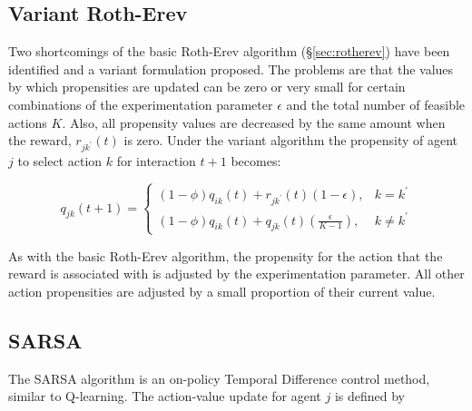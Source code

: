 \subsection{Variant Roth-Erev}
\label{sec:variant}
Two shortcomings of the basic Roth-Erev algorithm (\S\ref{sec:rotherev}) have
been identified and a variant formulation proposed\cite{nicolaisen:2001}. The
problems are that the values by which propensities are updated can be zero or
very small for certain combinations of the experimentation parameter
$\epsilon$ and the total number of feasible actions $K$.  Also, all
propensity values are decreased by the same amount when the reward,
$r_{jk^\prime}(t)$ is zero.  Under the variant algorithm the propensity of
agent $j$ to select action $k$ for interaction $t+1$ becomes:

\begin{equation}
q_{jk}(t+1) =
\begin{cases}
(1-\phi)q_{ik}(t) + r_{jk^\prime}(t)(1-\epsilon), & \text{$k = k^\prime$} \\
(1-\phi)q_{ik}(t) + q_{jk}(t)(\frac{\epsilon}{K-1}), & \text{$k \ne
k^\prime$}
\end{cases}
\end{equation}

As with the basic Roth-Erev algorithm, the propensity for the action that the
reward is associated with is adjusted by the experimentation parameter.  All
other action propensities are adjusted by a small proportion of their current
value.

\subsection{SARSA}
\label{sec:sarsa}
%
%
The SARSA algorithm is an on-policy Temporal Difference control method, similar
to Q-learning.  The action-value update for agent $j$ is defined by

